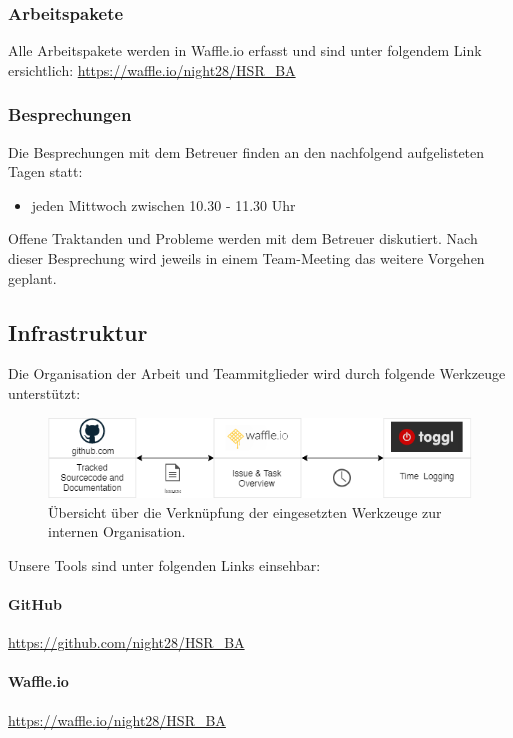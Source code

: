 \subsubsection{Arbeitspakete}
Alle Arbeitspakete werden in Waffle.io erfasst und sind unter folgendem Link ersichtlich:
\href{Waffle.io}{https://waffle.io/night28/HSR\_BA}
\subsubsection{Besprechungen}
Die Besprechungen mit dem Betreuer finden an den nachfolgend aufgelisteten Tagen statt:
\begin{itemize}
	\item jeden Mittwoch zwischen 10.30 - 11.30 Uhr
\end{itemize}

Offene Traktanden und Probleme werden mit dem Betreuer diskutiert. Nach dieser Besprechung wird jeweils in einem Team-Meeting das weitere Vorgehen geplant.


\subsection{Infrastruktur}
Die Organisation der Arbeit und Teammitglieder wird durch folgende Werkzeuge unterstützt:

\begin{figure}[H]
	\centering
	\includegraphics[width=13cm]{img/EingesetzteToolsZurOrganisation.png}
	\caption{Übersicht über die Verknüpfung der eingesetzten Werkzeuge zur internen Organisation.}
	\label{fig:Interne Organisationsstruktur}
\end{figure} 

Unsere Tools sind unter folgenden Links einsehbar:
\paragraph{GitHub} \href{https://github.com/night28/HSR\_BA}{https://github.com/night28/HSR\_BA} 

\paragraph{Waffle.io} \href{https://waffle.io/night28/HSR\_BA}{https://waffle.io/night28/HSR\_BA}

